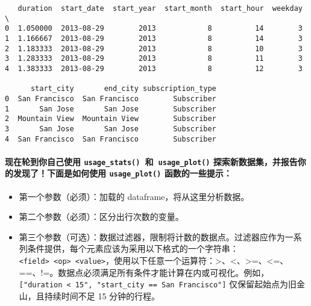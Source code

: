 \documentclass[11pt]{article}
\begin{document}
    
    \begin{verbatim}
   duration  start_date  start_year  start_month  start_hour  weekday  \
0  1.050000  2013-08-29        2013            8          14        3   
1  1.166667  2013-08-29        2013            8          14        3   
2  1.183333  2013-08-29        2013            8          10        3   
3  1.283333  2013-08-29        2013            8          11        3   
4  1.383333  2013-08-29        2013            8          12        3   

      start_city       end_city subscription_type  
0  San Francisco  San Francisco        Subscriber  
1       San Jose       San Jose        Subscriber  
2  Mountain View  Mountain View        Subscriber  
3       San Jose       San Jose        Subscriber  
4  San Francisco  San Francisco        Subscriber  
    \end{verbatim}

    
    \paragraph{\texorpdfstring{现在轮到你自己使用
\texttt{usage\_stats()}~和~\texttt{usage\_plot()}
探索新数据集，并报告你的发现了！下面是如何使用 \texttt{usage\_plot()}
函数的一些提示：}{现在轮到你自己使用 usage\_stats()~和~usage\_plot() 探索新数据集，并报告你的发现了！下面是如何使用 usage\_plot() 函数的一些提示：}}\label{ux73b0ux5728ux8f6eux5230ux4f60ux81eaux5df1ux4f7fux7528-usage_statsux548cusage_plot-ux63a2ux7d22ux65b0ux6570ux636eux96c6ux5e76ux62a5ux544aux4f60ux7684ux53d1ux73b0ux4e86ux4e0bux9762ux662fux5982ux4f55ux4f7fux7528-usage_plot-ux51fdux6570ux7684ux4e00ux4e9bux63d0ux793a}

\begin{itemize}
\item
  第一个参数（必须）：加载的 dataframe，将从这里分析数据。
\item
  第二个参数（必须）：区分出行次数的变量。
\item
  第三个参数（可选）：数据过滤器，限制将计数的数据点。过滤器应作为一系列条件提供，每个元素应该为采用以下格式的一个字符串：\texttt{\textquotesingle{}\textless{}field\textgreater{}\ \textless{}op\textgreater{}\ \textless{}value\textgreater{}\textquotesingle{}}，使用以下任意一个运算符：\textgreater{}、\textless{}、\textgreater{}=、\textless{}=、==、!=。数据点必须满足所有条件才能计算在内或可视化。例如，\texttt{{[}"duration\ \textless{}\ 15",\ "start\_city\ ==\ \textquotesingle{}San\ Francisco\textquotesingle{}"{]}}
  仅保留起始点为旧金山，且持续时间不足 15 分钟的行程。
\end{itemize}
\end{document}
